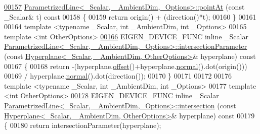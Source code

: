 \begin{DoxyCode}
\hyperlink{group___geometry___module_ae0a510cc78156974ab5a7fb8a6b2326a}{00157} \hyperlink{group___geometry___module_ae0a510cc78156974ab5a7fb8a6b2326a}{ParametrizedLine<\_Scalar, \_AmbientDim,\_Options>::pointAt}
      (\textcolor{keyword}{const} \_Scalar& t)\textcolor{keyword}{ const}
00158 \textcolor{keyword}{}\{
00159   \textcolor{keywordflow}{return} origin() + (direction()*t); 
00160 \}
00161 
00164 \textcolor{keyword}{template} <\textcolor{keyword}{typename} \_Scalar, \textcolor{keywordtype}{int} \_AmbientDim, \textcolor{keywordtype}{int} \_Options>
00165 \textcolor{keyword}{template} <\textcolor{keywordtype}{int} OtherOptions>
\hyperlink{group___geometry___module_ad476025bb806ab3c8fd14d2381139dbc}{00166} EIGEN\_DEVICE\_FUNC \textcolor{keyword}{inline} \_Scalar 
      \hyperlink{group___geometry___module_class_eigen_1_1_parametrized_line}{ParametrizedLine<\_Scalar, \_AmbientDim,\_Options>::intersectionParameter}
      (\textcolor{keyword}{const} \hyperlink{group___geometry___module_class_eigen_1_1_hyperplane}{Hyperplane<\_Scalar, \_AmbientDim, OtherOptions>}& 
      hyperplane)\textcolor{keyword}{ const}
00167 \textcolor{keyword}{}\{
00168   \textcolor{keywordflow}{return} -(hyperplane.\hyperlink{group___geometry___module_afe2eadf3679e4a802c0e02c15049aed9}{offset}()+hyperplane.\hyperlink{group___geometry___module_ad3da930fc7025604f2f174651089b2a8}{normal}().dot(origin()))
00169           / hyperplane.\hyperlink{group___geometry___module_ad3da930fc7025604f2f174651089b2a8}{normal}().dot(direction());
00170 \}
00171 
00172 
00176 \textcolor{keyword}{template} <\textcolor{keyword}{typename} \_Scalar, \textcolor{keywordtype}{int} \_AmbientDim, \textcolor{keywordtype}{int} \_Options>
00177 \textcolor{keyword}{template} <\textcolor{keywordtype}{int} OtherOptions>
\hyperlink{group___geometry___module_a512be7d79c7c982380e59ddf84d61252}{00178} EIGEN\_DEVICE\_FUNC \textcolor{keyword}{inline} \_Scalar 
      \hyperlink{group___geometry___module_class_eigen_1_1_parametrized_line}{ParametrizedLine<\_Scalar, \_AmbientDim,\_Options>::intersection}
      (\textcolor{keyword}{const} \hyperlink{group___geometry___module_class_eigen_1_1_hyperplane}{Hyperplane<\_Scalar, \_AmbientDim, OtherOptions>}& 
      hyperplane)\textcolor{keyword}{ const}
00179 \textcolor{keyword}{}\{
00180   \textcolor{keywordflow}{return} intersectionParameter(hyperplane);

\end{DoxyCode}
